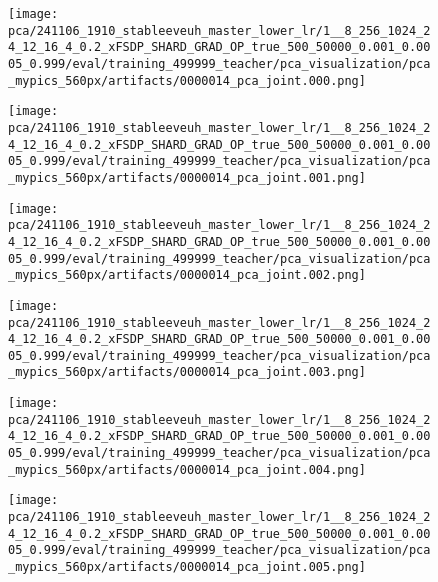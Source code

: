 \begin{figure*}[p]
\begin{subfigure}[t]{0.097\textwidth}
    \end{subfigure}
    \begin{subfigure}[t]{0.097\textwidth}
        \centering
        \texttt{[image: pca/241106\_1910\_stableeveuh\_master\_lower\_lr/1\_\_8\_256\_1024\_24\_12\_16\_4\_0.2\_xFSDP\_SHARD\_GRAD\_OP\_true\_500\_50000\_0.001\_0.0005\_0.999/eval/training\_499999\_teacher/pca\_visualization/pca\_mypics\_560px/artifacts/0000014\_pca\_joint.000.png]}
    \end{subfigure}\hfill
    \begin{subfigure}[t]{0.097\textwidth}
        \centering
        \texttt{[image: pca/241106\_1910\_stableeveuh\_master\_lower\_lr/1\_\_8\_256\_1024\_24\_12\_16\_4\_0.2\_xFSDP\_SHARD\_GRAD\_OP\_true\_500\_50000\_0.001\_0.0005\_0.999/eval/training\_499999\_teacher/pca\_visualization/pca\_mypics\_560px/artifacts/0000014\_pca\_joint.001.png]}
    \end{subfigure}\hfill
    \begin{subfigure}[t]{0.097\textwidth}
        \centering
        \texttt{[image: pca/241106\_1910\_stableeveuh\_master\_lower\_lr/1\_\_8\_256\_1024\_24\_12\_16\_4\_0.2\_xFSDP\_SHARD\_GRAD\_OP\_true\_500\_50000\_0.001\_0.0005\_0.999/eval/training\_499999\_teacher/pca\_visualization/pca\_mypics\_560px/artifacts/0000014\_pca\_joint.002.png]}
    \end{subfigure}\hfill
    \begin{subfigure}[t]{0.097\textwidth}
        \centering
        \texttt{[image: pca/241106\_1910\_stableeveuh\_master\_lower\_lr/1\_\_8\_256\_1024\_24\_12\_16\_4\_0.2\_xFSDP\_SHARD\_GRAD\_OP\_true\_500\_50000\_0.001\_0.0005\_0.999/eval/training\_499999\_teacher/pca\_visualization/pca\_mypics\_560px/artifacts/0000014\_pca\_joint.003.png]}
    \end{subfigure}\hfill
    \begin{subfigure}[t]{0.097\textwidth}
        \centering
        \texttt{[image: pca/241106\_1910\_stableeveuh\_master\_lower\_lr/1\_\_8\_256\_1024\_24\_12\_16\_4\_0.2\_xFSDP\_SHARD\_GRAD\_OP\_true\_500\_50000\_0.001\_0.0005\_0.999/eval/training\_499999\_teacher/pca\_visualization/pca\_mypics\_560px/artifacts/0000014\_pca\_joint.004.png]}
    \end{subfigure}\hfill
    \begin{subfigure}[t]{0.097\textwidth}
        \centering
        \texttt{[image: pca/241106\_1910\_stableeveuh\_master\_lower\_lr/1\_\_8\_256\_1024\_24\_12\_16\_4\_0.2\_xFSDP\_SHARD\_GRAD\_OP\_true\_500\_50000\_0.001\_0.0005\_0.999/eval/training\_499999\_teacher/pca\_visualization/pca\_mypics\_560px/artifacts/0000014\_pca\_joint.005.png]}

\end{subfigure}
\end{figure*}
